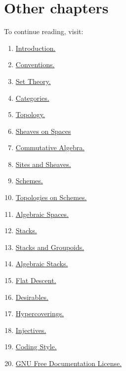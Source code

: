 \section{Other chapters}

\noindent
To continue reading, visit:
\begin{multicols}{2}
\begin{enumerate}
\item \hyperref[introduction-section-overview]{Introduction.}
\item \hyperref[conventions-section-comments]{Conventions.}
\item \hyperref[sets-section-introduction]{Set Theory.}
\item \hyperref[categories-section-introduction]{Categories.}
\item \hyperref[topology-section-introduction]{Topology.}
\item \hyperref[sheaves-section-introduction]{Sheaves on Spaces}
\item \hyperref[algebra-section-introduction]{Commutative Algebra.}
\item \hyperref[sites-section-introduction]{Sites and Sheaves.}
\item \hyperref[schemes-section-introduction]{Schemes.}
\item \hyperref[etale-section-introduction]{Topologies on Schemes.}
\item \hyperref[spaces-section-introduction]{Algebraic Spaces.}
\item \hyperref[stacks-section-introduction]{Stacks.}
\item \hyperref[stacks-groupoids-section-introduction]{Stacks and Groupoids.}
\item \hyperref[algebraic-section-introduction]{Algebraic Stacks.}
\item \hyperref[flat-section-introduction]{Flat Descent.}
\item \hyperref[desirables-section-introduction]{Desirables.}
\item \hyperref[hypercovering-section-introduction]{Hypercoverings.}
\item \hyperref[injectives-section-introduction]{Injectives.}
\item \hyperref[coding-section-style]{Coding Style.}
\item \hyperref[fdl-version]{GNU Free Documentation License.}
\end{enumerate}
\end{multicols}
